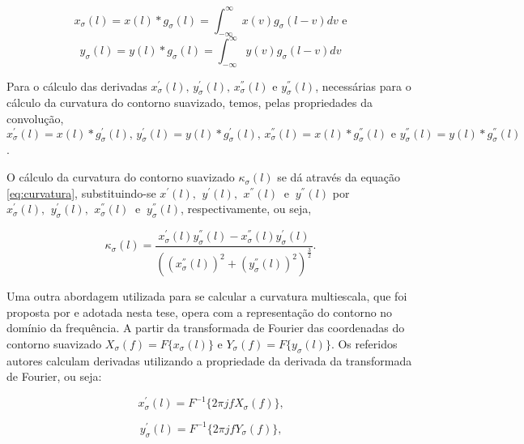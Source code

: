 \begin{equation}
x_{\sigma}(l) = x(l) * g_{\sigma}(l) = \int^{\infty}_{-\infty}{x(v)g_{\sigma}(l-v)}dv \text{ e}
\end{equation}
\begin{equation}
y_{\sigma}(l) = y(l) * g_{\sigma}(l)=\int^{\infty}_{-\infty}{y(v)g_{\sigma}(l-v)}dv
\end{equation}

Para o cálculo das derivadas $x^{'}_{\sigma}(l)\text{, }y^{'}_{\sigma}(l)\text{, }x^{''}_{\sigma}(l) \text{ e }y^{''}_{\sigma}(l)$, necessárias para o cálculo da curvatura do contorno suavizado, temos, pelas propriedades da convolução, $x^{'}_{\sigma}(l) = x(l) * g^{'}_{\sigma}(l)\text{, }y^{'}_{\sigma}(l) = y(l) * g^{'}_{\sigma}(l)\text{, }x^{''}_{\sigma}(l) = x(l) * g^{''}_{\sigma}(l)\text{ e }
y^{''}_{\sigma}(l) = y(l) * g^{''}_{\sigma}(l)$.

O cálculo da curvatura do contorno suavizado $\kappa_{\sigma}(l)$ se dá através da equação \ref{eq:curvatura}, substituindo-se $x^{'}(l)\text{, }\:y^{'}(l)\text{, }\:x^{''}(l)\:\text{ e }\:y^{''}(l)$ por $x^{'}_{\sigma}(l)\text{, }\:y^{'}_{\sigma}(l)\text{, }\:x^{''}_{\sigma}(l)\:\text{ e }\:y^{''}_{\sigma}(l)$, respectivamente, ou seja,

\begin{equation} \label{eq:curvatura_ms}
\kappa_{\sigma}(l) = \frac{x_{\sigma}^{'}(l)y_{\sigma}^{''}(l)-x_{\sigma}^{''}(l)y_{\sigma}^{'}(l)}{((x_{\sigma}^{''}(l))^{2}+(y_{\sigma}^{''}(l))^{2})^{\frac{3}{2}}}\text{.}
\end{equation}

Uma outra abordagem utilizada para se calcular a curvatura multiescala, que foi proposta por  e adotada nesta tese, opera com a representação do contorno no domínio da frequência. A partir da transformada de Fourier das coordenadas do contorno suavizado $X_{\sigma}(f) = F\big\{x_{\sigma}(l)\big\}$ e $Y_{\sigma}(f) = F\big\{y_{\sigma}(l)\big\}$. Os referidos autores calculam derivadas utilizando a propriedade da derivada da transformada de Fourier, ou seja:

\begin{equation}
x_{\sigma}^{'}(l) = F^{-1}\big\{2 \pi j f  X_{\sigma}(f)\big\}\text{,}
\end{equation}

\begin{equation}
y_{\sigma}^{'}(l) = F^{-1}\big\{2 \pi j f  Y_{\sigma}(f)\big\}\text{,}
\end{equation}

